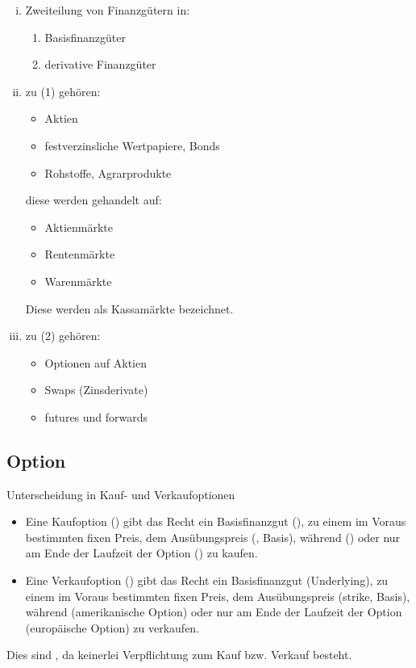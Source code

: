 \begin{enumerate}[(i)]
	\item Zweiteilung von Finanzgütern in:
	\begin{enumerate}[(1)]
		\item Basisfinanzgüter
		\item derivative Finanzgüter
	\end{enumerate}
	\item zu (1) gehören:
	\begin{itemize}
		\item Aktien
		\item festverzinsliche Wertpapiere, Bonds
		\item Rohstoffe, Agrarprodukte
	\end{itemize}
diese werden gehandelt auf:
	\begin{itemize}
		\item Aktienmärkte
		\item Rentenmärkte
		\item Warenmärkte
	\end{itemize}
Diese werden als Kassamärkte bezeichnet.

	\item zu (2) gehören:
	\begin{itemize}
		\item Optionen auf Aktien
		\item Swaps (Zinsderivate)
		\item futures und forwards
	\end{itemize}

\end{enumerate}

\subsection{Option} %
\label{sub: option}
Unterscheidung in Kauf- und Verkaufoptionen
\begin{itemize}
	\item Eine Kaufoption () gibt das Recht ein Basisfinanzgut (), zu einem im Voraus bestimmten fixen Preis,
		dem Ausübungspreis (, Basis), während () oder nur am Ende der Laufzeit der Option 	()
		zu kaufen.
	\item  Eine Verkaufoption () gibt das Recht ein Basisfinanzgut (Underlying), zu einem im Voraus bestimmten fixen Preis,
		dem Ausübungspreis (strike, Basis), während (amerikanische Option) oder nur am Ende der Laufzeit der Option (europäische Option)
		zu verkaufen.
\end{itemize}
Dies sind  , da keinerlei Verpflichtung zum Kauf bzw. Verkauf besteht.

